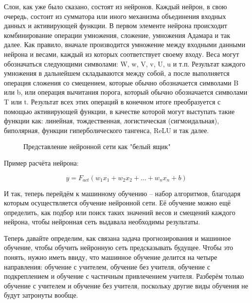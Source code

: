 {  \par \redline Слои, как уже было сказано, состоят из нейронов. Каждый нейрон, в свою очередь, состоит из сумматора или иного механизма объединения входных данных и активирующей функции. В первом элементе нейрона происходит комбинирование операции умножения, сложение, умножения Адамара и так далее. Как правило, вначале производится умножение между входными данными нейрона и весами, каждый из которых соответствует своему входу. Веса могут обозначаться следующими символами: W, w, V, v, U, u и т.п. Результат каждого умножения в дальнейшем складываются между собой, а после выполняется операция сложения со смещением, которые обычно обозначается символами B или b, или операция вычитания порога, который обычно обозначается символами T или t.  Результат всех этих операций в конечном итоге преобразуется с помощью активирующей функции, в качестве которой могут выступать такие функции как: линейная, тождественная, логистическая (сигмоидальная), биполярная, функции гиперболического тангенса, ReLU и так далее.  

  \begin{figure}
    \centering
    \def\svgwidth{\textwidth}
    
    \caption{Представление нейронной сети как "белый ящик"}
    \label{fig:Neuron}
  \end{figure}

  Пример расчёта нейрона:

  \[y = F_{act}\left(w_1x_1 + w_2x_2 + \dots + w_nx_n + b\right)\]

  \par \redline И так, теперь перейдём к машинному обучению – набор алгоритмов, благодаря которым осуществляется обучение нейронной сети. Её обучение можно ещё определить, как подбор или поиск таких значений весов и смещений каждого нейрона, чтобы нейронная сеть выдавала необходимы результаты. 

  \par \redline Теперь давайте определим, как связана задача прогнозирования и машинное обучение, чтобы обучить нейронную сеть предсказывать будущее. Чтобы это понять, нужно иметь ввиду, что машинное обучение делится на четыре направления: обучение с учителем, обучение без учителя, обучение с подкреплением и обучение с частичным привлечением учителя. Разберём только обучение с учителем и обучение без учителя, поскольку другие виды обучения не будут затронуты вообще. 

}
